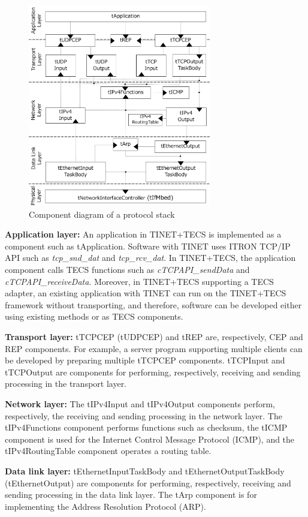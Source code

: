 \documentclass[JIP]{ipsj_v2/UTF8/ipsj}
\begin{document}
\begin{figure}[t]
    \centering
    \includegraphics[width=8.0cm,clip]{figure/ComponentProtocolStack.pdf}
    \caption{Component diagram of a protocol stack}
    \label{fig:ComponentProtocolStack}
\end{figure}


{\bf Application layer:}
An application in TINET+TECS is implemented as a component such as tApplication.
Software with TINET uses ITRON TCP/IP API \cite{url:ITRON_TCP/IP_API_Spec} such as {\it tcp\_snd\_dat} and {\it tcp\_rcv\_dat}.
In TINET+TECS, the application component calls TECS functions such as {\it cTCPAPI\_sendData} and {\it cTCPAPI\_receiveData}.
Moreover, in TINET+TECS supporting a TECS adapter, an existing application with TINET can run on the TINET+TECS framework without transporting, and therefore, software can be developed either using existing methods or as TECS components.

{\bf Transport layer:}
tTCPCEP (tUDPCEP) and tREP are, respectively, CEP and REP components.
For example, a server program supporting multiple clients can be developed by preparing multiple tTCPCEP components.
tTCPInput and tTCPOutput are components for performing, respectively, receiving and sending processing in the transport layer.

{\bf Network layer:}
The tIPv4Input and tIPv4Output components perform, respectively, the receiving and sending processing in the network layer.
The tIPv4Functions component performs functions such as checksum, the tICMP component is used for the Internet Control Message Protocol (ICMP), and the tIPv4RoutingTable component operates a routing table.

{\bf Data link layer:}
tEthernetInputTaskBody and tEthernetOutputTaskBody (tEthernetOutput) are components for performing, respectively, receiving and sending processing in the data link layer.
The tArp component is for implementing the Address Resolution Protocol (ARP).
\end{document}
